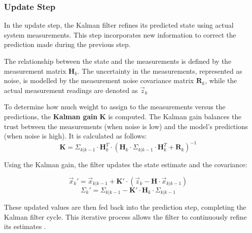 \subsubsection{Update Step}
In the update step, the Kalman filter refines its predicted state using actual system measurements. This step incorporates new information to correct the prediction made during the previous step.

The relationship between the state and the measurements is defined by the measurement matrix \( \mathbf{H}_k \). The uncertainty in the measurements, represented as noise, is modelled by the measurement noise covariance matrix \( \mathbf{R}_k \), while the actual measurement readings are denoted as \( \vec{z}_k \)

To determine how much weight to assign to the measurements versus the predictions, the \textbf{Kalman gain} \( \mathbf{K} \) is computed. The Kalman gain balances the trust between the measurements (when noise is low) and the model's predictions (when noise is high). It is calculated as follows:
\[
\mathbf{K} = \Sigma_{k|k-1} \cdot \mathbf{H}_k^T \cdot \left( \mathbf{H}_k \cdot \Sigma_{k|k-1} \cdot \mathbf{H}_k^T + \mathbf{R}_k \right)^{-1}
\]

Using the Kalman gain, the filter updates the state estimate and the covariance:

\[
\vec{x}_{k}' = \vec{x}_{k|k-1} + \mathbf{K}' \cdot \left( \vec{z}_k - \mathbf{H} \cdot \vec{x}_{k|k-1} \right)
\]
\[
\Sigma_k' = \Sigma_{k|k-1} - \mathbf{K}' \cdot \mathbf{H}_k \cdot \Sigma_{k|k-1}
\]

These updated values are then fed back into the prediction step, completing the Kalman filter cycle. This iterative process allows the filter to continuously refine its estimates \cite{zarchan2015kalman}.